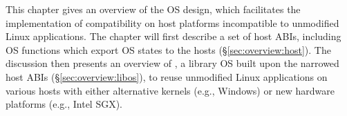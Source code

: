 This chapter gives an overview of the  OS design,  which facilitates the implementation of compatibility on host platforms  incompatible to unmodified Linux applications.
The chapter will first describe %
a set of host  ABIs,
including OS functions which export OS states to the hosts (\S\ref{sec:overview:host}).
The discussion then presents an overview of \graphene{},
a library OS built upon the narrowed host ABIs (\S\ref{sec:overview:libos}), to reuse unmodified Linux applications
on various hosts with either alternative kernels (e.g., Windows) or new hardware platforms (e.g., Intel SGX).
